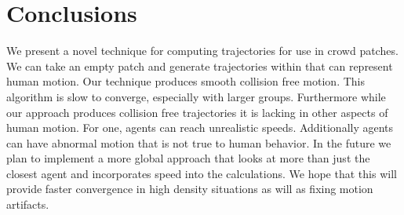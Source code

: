 \section{Conclusions}
\label{sec:conclusions}

We present a novel technique for computing trajectories for use in crowd patches. 
We can take an empty patch and generate trajectories within that can represent human motion. Our technique produces smooth collision free motion. This algorithm is slow to converge, especially with larger groups. Furthermore while our approach produces collision free trajectories it is lacking in other aspects of human motion. For one, agents can reach unrealistic speeds. Additionally agents can have abnormal motion that is not true to human behavior. In the future we plan to implement a more global approach that looks at more than just the closest agent and incorporates speed into the calculations. We hope that this will provide faster convergence in high density situations as will as fixing motion artifacts.


